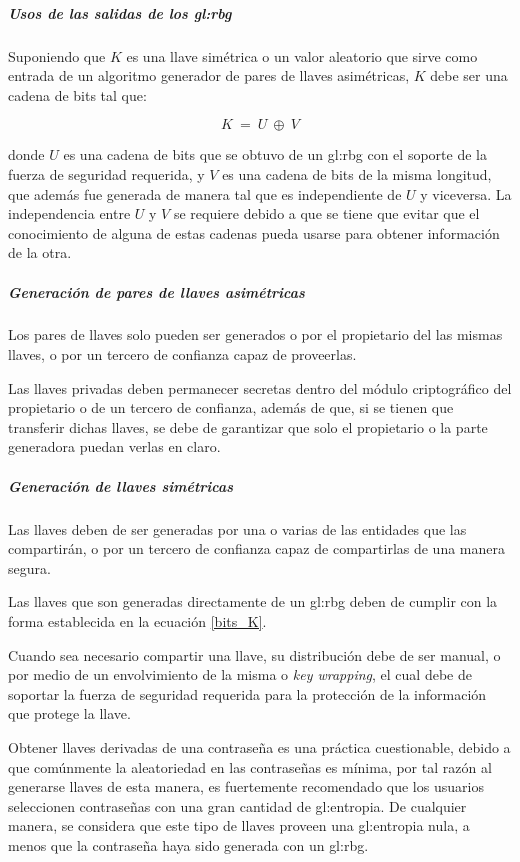 \subparagraph{Usos de las salidas de los \gls{gl:rbg}}
Suponiendo que $K$ es una llave simétrica o un valor aleatorio que sirve 
como entrada de un algoritmo generador de pares de llaves asimétricas, $K$ 
debe ser una cadena de bits tal que: 

\begin{equation}
  \label{bits_K}
  K\: =\: U\: \oplus\: V
\end{equation}

donde $U$ es una cadena de bits que se obtuvo de un \gls{gl:rbg} con el 
soporte de la fuerza de seguridad requerida, y $V$ es una cadena de bits de la 
misma longitud, que además fue generada de manera tal que es independiente de 
$U$ y viceversa. La independencia entre $U$ y $V$ se requiere debido a que se 
tiene que evitar que el conocimiento de alguna de estas cadenas pueda usarse 
para obtener información de la otra.

\subparagraph{Generación de pares de llaves asimétricas}
Los pares de llaves solo pueden ser generados o por el propietario del las 
mismas llaves, o por un tercero de confianza capaz de proveerlas.

Las llaves privadas deben permanecer secretas dentro del módulo criptográfico 
del propietario o de un tercero de confianza, además de que, si se tienen que 
transferir dichas llaves, se debe de garantizar que solo el propietario o la 
parte generadora puedan verlas en claro.

\subparagraph{Generación de llaves simétricas}
Las llaves deben de ser generadas por una o varias de las entidades que 
las compartirán, o por un tercero de confianza capaz de compartirlas de una 
manera segura. 

Las llaves que son generadas directamente de un \gls{gl:rbg} deben de cumplir 
con la forma establecida en la ecuación \ref{bits_K}.

Cuando sea necesario compartir una llave, su distribución debe de ser manual, 
o por medio de un envolvimiento de la misma o \textit{key wrapping}, el cual 
debe de soportar la fuerza de seguridad requerida para la protección de la 
información que protege la llave.

Obtener llaves derivadas de una contraseña es una práctica cuestionable, 
debido a que comúnmente la aleatoriedad en las contraseñas es mínima, por tal 
razón al generarse llaves de esta manera, es fuertemente recomendado que los 
usuarios seleccionen contraseñas con una gran cantidad de \gls{gl:entropia}. 
De cualquier manera, se considera que este tipo de llaves proveen una 
\gls{gl:entropia} nula, a menos que la contraseña haya sido generada con 
un \gls{gl:rbg}.


